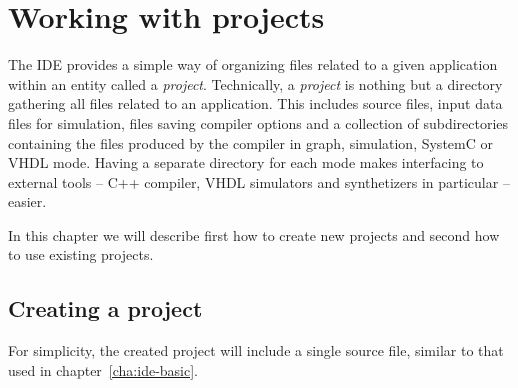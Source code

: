 
\chapter{Working with projects}
\label{cha:ide-project}

The \caph IDE provides a simple way of organizing files related to a given application within an entity
called a \emph{project}. Technically, a \emph{project} is nothing but a directory gathering all
files related to an application. This includes \caph source files, input data files for simulation,
files saving compiler options and a collection of subdirectories containing the files
produced by the compiler in graph, simulation, SystemC or VHDL mode. Having a separate directory for
each mode makes interfacing to external tools -- C++ compiler, VHDL simulators and synthetizers in
particular -- easier.

\medskip
In this chapter we will describe first how to create new projects and second how to use existing projects.

\section{Creating a project}
\label{sec:creating-project}

For simplicity, the created project will include a single source file, similar to that used
in chapter~\ref{cha:ide-basic}.

